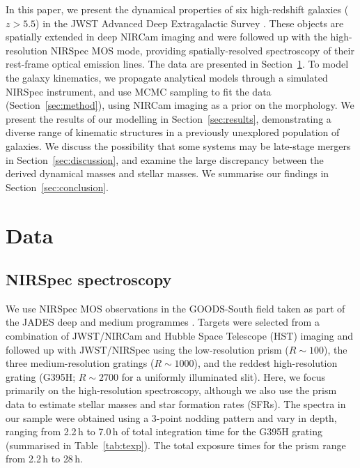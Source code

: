 \documentclass[longauth]{aa}
\begin{document}
In this paper, we present the dynamical properties of six high-redshift galaxies ($z>5.5$) in the JWST Advanced Deep Extragalactic Survey \citep[JADES;][]{Eisenstein2023}. These objects are spatially extended in deep NIRCam imaging and were followed up with the high-resolution NIRSpec MOS mode, providing spatially-resolved spectroscopy of their rest-frame optical emission lines. The data are presented in Section~\ref{sec:data}. To model the galaxy kinematics, we propagate analytical models through a simulated NIRSpec instrument, and use MCMC sampling to fit the data (Section~\ref{sec:method}), using NIRCam imaging as a prior on the morphology. We present the results of our modelling in Section~\ref{sec:results}, demonstrating a diverse range of kinematic structures in a previously unexplored population of galaxies. We discuss the possibility that some systems may be late-stage mergers in Section~\ref{sec:discussion}, and examine the large discrepancy between the derived dynamical masses and stellar masses. We summarise our findings in Section~\ref{sec:conclusion}. 







\section{Data}\label{sec:data}





\subsection{NIRSpec spectroscopy}

We use NIRSpec MOS observations in the GOODS-South field taken as part of the JADES deep and medium programmes \citep[ID numbers 1210 and 1286, PI N. L\"utzgendorf;][]{Bunker2023,Eisenstein2023}. Targets were selected from a combination of JWST/NIRCam and Hubble Space Telescope (HST) imaging and followed up with JWST/NIRSpec using the low-resolution prism ($R\sim100$), the three medium-resolution gratings ($R\sim1000$), and the reddest high-resolution grating (G395H; $R\sim2700$ for a uniformly illuminated slit). Here, we focus primarily on the high-resolution spectroscopy, although we also use the prism data to estimate stellar masses and star formation rates (SFRs). The spectra in our sample were obtained using a 3-point nodding pattern and vary in depth, ranging from 2.2\,h to 7.0\,h of total integration time for the G395H grating (summarised in Table~\ref{tab:texp}). The total exposure times for the prism range from 2.2\,h to 28\,h.
\end{document}
